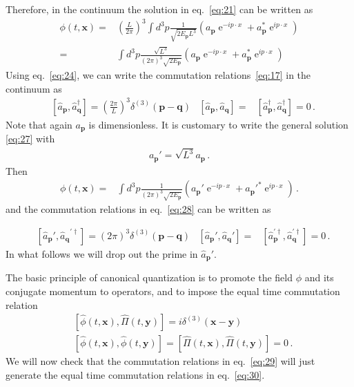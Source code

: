 \begin{frame}
Therefore, in the continuum the solution in eq.~\eqref{eq:21} can be written as
\begin{align}
\label{eq:27}
  \phi(t,\mathbf{x})=&\left(\frac{L}{2\pi}\right)^3\int d^3p \frac{1}{\sqrt{2E_\mathbf{p} L^3}}
  \left(a_\mathbf{p} \operatorname{e}^{-i p\cdot x }+a_\mathbf{p}^* \operatorname{e}^{i p\cdot x }\right)\nonumber\\
=&\int d^3p \frac{\sqrt{L^3}}{(2\pi)^3\sqrt{2E_\mathbf{p} }}
  \left(a_\mathbf{p} \operatorname{e}^{-i p\cdot x }+a_\mathbf{p}^* \operatorname{e}^{i p\cdot x }\right)
\end{align}
Using eq.~\eqref{eq:24}, we can write the commutation relations~\eqref{eq:17} in the continuum as
\begin{align}
\label{eq:28}
  &\left[\widehat{a}_\mathbf{p},\widehat{a}_\mathbf{q}^\dagger\right]=
\left(\frac{2\pi}{L}\right)^3\delta^{(3)}(\mathbf{p}-\mathbf{q})
&\left[\widehat{a}_\mathbf{p},\widehat{a}_\mathbf{q}\right]=&
\left[\widehat{a}_\mathbf{p}^\dagger,\widehat{a}_\mathbf{q}^\dagger\right]=0\,.
\end{align}
Note that again $a_{\mathbf{p}}$ is dimensionless. It is customary to write the general solution \eqref{eq:27} with
\begin{align}
  a_{\mathbf{p}}'=\sqrt{L^3}a_{\mathbf{p}}\,.
\end{align}
Then
\begin{align}
  \phi(t,\mathbf{x})=&\int d^3p \frac{1}{(2\pi)^3\sqrt{2E_\mathbf{p} }}
  \left(a_\mathbf{p}' \operatorname{e}^{-i p\cdot x }+{a_\mathbf{p}'}^* \operatorname{e}^{i p\cdot x }\right)\,.
\end{align}
and the commutation relations in eq.~\eqref{eq:28} can be written as

\begin{align}
\label{eq:29}
  &\left[\widehat{a}_{\mathbf{p}}',{\widehat{a}_{\mathbf{q}}}^{\prime \dagger}\right]=
\left(2\pi\right)^3\delta^{(3)}(\mathbf{p}-\mathbf{q})
&\left[\widehat{a}_{\mathbf{p}}',\widehat{a}_{\mathbf{q}}'\right]=&
\left[\widehat{a}_\mathbf{p}^{\prime\dagger},\widehat{a}_\mathbf{q}^{\prime\dagger}\right]=0\,.
\end{align}
In what follows we will drop out the prime in $\widehat{a}_{\mathbf{p}}'$.


The basic principle of canonical quantization is to promote the field $\phi$ and its conjugate momentum to operators, and to impose the equal time commutation relation
\begin{align}
  \label{eq:30}
  &\left[\widehat{\phi}(t,\mathbf{x}),\widehat{\Pi}(t,\mathbf{y})\right]=
  i\delta^{(3)}(\mathbf{x}-\mathbf{y})\nonumber\\
  &\left[\widehat{\phi}(t,\mathbf{x}),\widehat{\phi}(t,\mathbf{y})\right]=
  \left[\widehat{\Pi}(t,\mathbf{x}),\widehat{\Pi}(t,\mathbf{y})\right]=
  0\,.
\end{align}
We will now check that the commutation relations in eq.~\eqref{eq:29} will just generate the equal time commutation relations in eq.~\eqref{eq:30}.


\end{frame}
